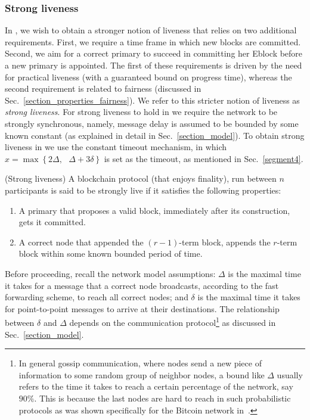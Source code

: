 \subsubsection*{Strong liveness}
In \nameNS, we wish to obtain a stronger notion of liveness that relies on two additional requirements. First, we require a time frame in which new blocks are committed. Second, we aim for a correct primary to succeed in committing her Eblock before a new primary is appointed. The first of these requirements is driven by the need for practical liveness (with a guaranteed bound on progress time), whereas the second requirement is related to fairness (discussed in Sec.~\ref{section_properties_fairness}). We refer to this stricter notion of liveness as \emph{strong liveness}. For strong liveness to hold in \name we require the network to be strongly synchronous, namely, message delay is assumed to be bounded by some known constant (as explained in detail in Sec.~\ref{section_model}). To obtain strong liveness in \name we use the constant timeout mechanism, in which $x = \max\left\{ 2\Delta, \text{ } \Delta+3\delta \right\}$ is set as the timeout, as mentioned in Sec.~\ref{segment4}. %

\begin{definition}{(Strong liveness)}
\label{definition_strong_liveness}
A blockchain protocol (that enjoys finality), run between $n$ participants is said to be strongly live if it satisfies the following properties:
\begin{enumerate}
\item A primary that proposes a valid block, immediately after its construction, gets it committed.
\item A correct node that appended the $(r-1)$-term block, appends the $r$-term block within some known bounded period of time.
\end{enumerate}
\end{definition}

Before proceeding, recall the network model assumptions: $\Delta$ is the maximal time it takes for a message that a correct node broadcasts, according to the fast forwarding scheme, to reach all correct nodes; and $\delta$ is the maximal time it takes for point-to-point messages to arrive at their destinations. The relationship between $\delta$ and $\Delta$ depends on the communication protocol\footnote{In general gossip communication, where nodes send a new piece of information to some random group of neighbor nodes, a bound like $\Delta$ usually refers to the time it takes to reach a certain percentage of the network, say $90\%$. This is because the last nodes are hard to reach in such probabilistic protocols as was shown specifically for the Bitcoin network in~\cite{BitcoinPropagation}.} as discussed in Sec.~\ref{section_model}.

